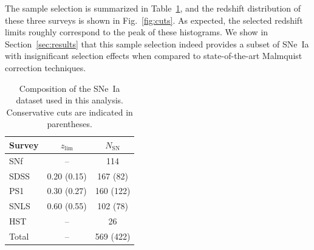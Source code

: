 \documentclass[]{aa}
\begin{document}
The sample selection is summarized in Table~\ref{tab:sample}, and the redshift
distribution of these three surveys is shown in Fig.~\ref{fig:cuts}. As
expected, the selected redshift limits roughly correspond to the peak of these
histograms. We show in Section~\ref{sec:results} that this sample selection
indeed provides a subset of SNe~Ia with insignificant selection effects when
compared to state-of-the-art Malmquist correction techniques.

\begin{table}
    \centering
    \caption{Composition of the SNe~Ia dataset used in this analysis.
    Conservative cuts are indicated in parentheses.}
    \label{tab:sample}
    \begin{tabular}{l c c}
        \hline\hline
        Survey & $z_{\lim}$ & $N_{\mathrm{SN}}$ \\
        \hline
        SNf   & --          & 114 \\
        SDSS  & 0.20 (0.15) & 167 (82)\\
        PS1   & 0.30 (0.27) & 160 (122)\\
        SNLS  & 0.60 (0.55) & 102 (78)\\
        HST   & --          & 26 \\
        \hline
        Total & --          & 569 (422) \\
        \hline
    \end{tabular}
\end{table}
\end{document}
